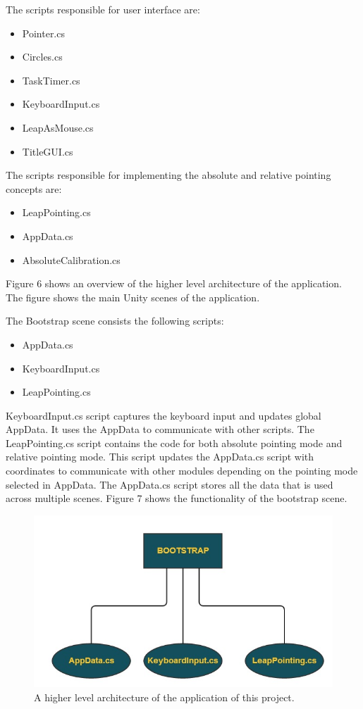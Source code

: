 \documentclass[titlepage]{article}
\begin{document}
The scripts responsible for user interface are:

\begin{itemize}
    \item Pointer.cs
    \item Circles.cs
    \item TaskTimer.cs
    \item KeyboardInput.cs
    \item LeapAsMouse.cs
    \item TitleGUI.cs
\end{itemize}

The scripts responsible for implementing the absolute and relative pointing concepts are:

\begin{itemize}
    \item LeapPointing.cs
    \item AppData.cs
    \item AbsoluteCalibration.cs

\end{itemize}

Figure 6 shows an overview of the higher level architecture of the application. The figure shows the main Unity scenes of the application.

The Bootstrap scene consists the following scripts:

\begin{itemize}
    \item AppData.cs
    \item KeyboardInput.cs
    \item LeapPointing.cs
\end{itemize}

KeyboardInput.cs script captures the keyboard input and updates global AppData. It uses the AppData to communicate with other scripts. The LeapPointing.cs script contains the code for both absolute pointing mode and relative pointing mode. This script updates the AppData.cs script with coordinates to communicate with other modules depending on the pointing mode selected in AppData. The AppData.cs script stores all the data that is used across multiple scenes. Figure 7 shows the functionality of the bootstrap scene.

\begin{figure}[!h]
\centering
\includegraphics[width=4.5in]{Figure_7}
\caption{A higher level architecture of the application of this project.}
\end{figure}
\end{document}
